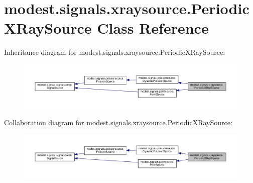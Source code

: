 \hypertarget{classmodest_1_1signals_1_1xraysource_1_1PeriodicXRaySource}{}\section{modest.\+signals.\+xraysource.\+Periodic\+X\+Ray\+Source Class Reference}
\label{classmodest_1_1signals_1_1xraysource_1_1PeriodicXRaySource}


Inheritance diagram for modest.\+signals.\+xraysource.\+Periodic\+X\+Ray\+Source\+:
\nopagebreak
\begin{figure}[H]
\begin{center}
\leavevmode
\includegraphics[width=350pt]{classmodest_1_1signals_1_1xraysource_1_1PeriodicXRaySource__inherit__graph}
\end{center}
\end{figure}


Collaboration diagram for modest.\+signals.\+xraysource.\+Periodic\+X\+Ray\+Source\+:
\nopagebreak
\begin{figure}[H]
\begin{center}
\leavevmode
\includegraphics[width=350pt]{classmodest_1_1signals_1_1xraysource_1_1PeriodicXRaySource__coll__graph}
\end{center}
\end{figure}
